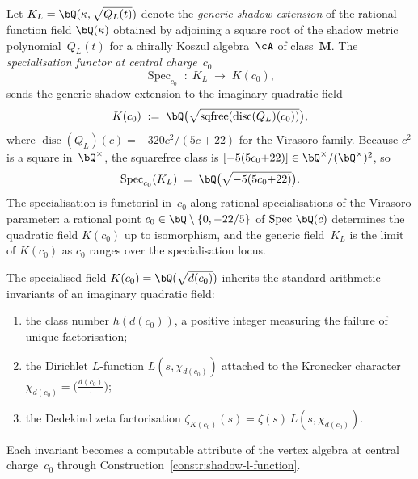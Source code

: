 \begin{definition}%
\label{def:specialised-shadow-field}%
%
%
Let $K_L = \bQ(\kappa, \sqrt{Q_L(t)})$ denote the
\emph{generic shadow extension} of the rational function
field $\bQ(\kappa)$ obtained by adjoining a square root of the
shadow metric polynomial~$Q_L(t)$ for a chirally Koszul
algebra~$\cA$ of class~$\mathbf{M}$.
The \emph{specialisation functor at central charge~$c_0$}
\[
 \operatorname{Spec}_{c_0}\;:\;
 K_L \;\longrightarrow\; K(c_0),
\]
sends the generic shadow extension to the imaginary quadratic
field
\[
 K(c_0)
 \;:=\;
 \bQ\bigl(\sqrt{\operatorname{sqfree}(\operatorname{disc}(Q_L)(c_0))}\bigr),
\]
where $\operatorname{disc}(Q_L)(c) = -320c^2/(5c{+}22)$ for the
Virasoro family. Because $c^2$ is a square in~$\bQ^\times$,
the squarefree class is
$[-5(5c_0{+}22)] \in \bQ^\times/(\bQ^\times)^2$, so
\begin{equation}\label{eq:specialised-shadow-field}
 \operatorname{Spec}_{c_0}(K_L)
 \;=\;
 \bQ\bigl(\sqrt{-5(5c_0{+}22)}\bigr).
\end{equation}
The specialisation is functorial in~$c_0$ along rational
specialisations of the Virasoro parameter: a rational point
$c_0 \in \bQ \setminus \{0, -22/5\}$ of
$\operatorname{Spec}\,\bQ(c)$ determines the quadratic field
$K(c_0)$ up to isomorphism, and the generic field~$K_L$ is
the limit of $K(c_0)$ as $c_0$ ranges over the specialisation
locus.
\end{definition}

\begin{remark}%
\label{rem:specialised-shadow-field-invariants}%
%
The specialised field $K(c_0) = \bQ(\sqrt{d(c_0)})$ inherits
the standard arithmetic invariants of an imaginary quadratic
field:
\begin{enumerate}[label=\textup{(\roman*)}]
\item the class number $h(d(c_0))$, a positive integer
 measuring the failure of unique factorisation;
\item the Dirichlet $L$-function $L(s, \chi_{d(c_0)})$ attached
 to the Kronecker character $\chi_{d(c_0)} =
 \bigl(\tfrac{d(c_0)}{\cdot}\bigr)$;
\item the Dedekind zeta factorisation $\zeta_{K(c_0)}(s) =
 \zeta(s)\,L(s, \chi_{d(c_0)})$.
\end{enumerate}
Each invariant becomes a computable attribute of the vertex
algebra at central charge~$c_0$ through
Construction~\textup{\ref{constr:shadow-l-function}}.
\end{remark}

